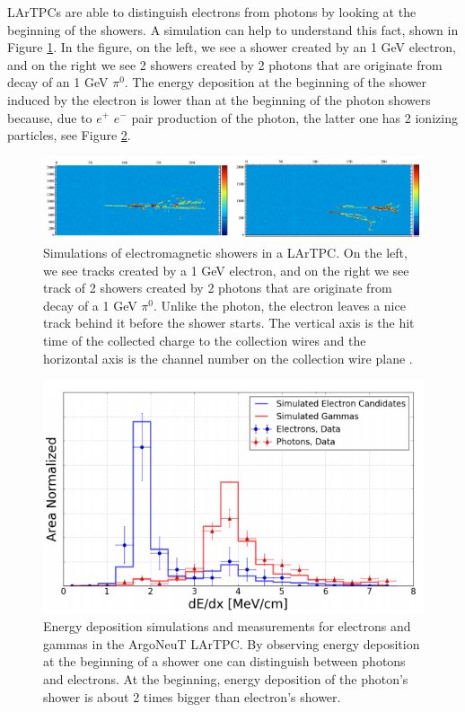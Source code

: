 \documentclass[a4paper]{article}\linespread{1.4}
\begin{document}
LArTPCs are able to distinguish electrons from photons by looking at the beginning of the showers. A simulation can help to understand this fact, shown in Figure \ref{fig:epi}. In the figure, on the left, we see a shower created by an 1 GeV electron, and on the right we see 2 showers created by 2 photons that are originate from decay of an 1 GeV $\pi^{0}$. 
The energy deposition at the beginning of the shower induced by the electron is lower than at the beginning of the photon showers because, due to $e^{+}$  $e^{-}$ pair production of the photon, the latter one has 2 ionizing particles, see Figure \ref{fig:mic}.
\begin{figure}[h!] \centering \includegraphics[width=124mm,scale=1.0]{epi.png} \caption{Simulations of electromagnetic showers in a LArTPC. On the left, we see tracks created by a 1 GeV electron, and on the right we see track of 2 showers created by 2 photons that are originate from decay of a 1 GeV $\pi^{0}$. Unlike the photon, the electron leaves a nice track behind it before the shower starts. The vertical axis is the hit time of the collected charge to the collection wires and the horizontal axis is the channel number on the collection wire plane \cite{LK}.} \label{fig:epi} \end{figure}  
\begin{figure}[h!] \centering \includegraphics[width=124mm,scale=1.0]{mic_neu.png} \caption{Energy deposition simulations and measurements for electrons and gammas in the ArgoNeuT LArTPC. By observing energy deposition at the beginning of a shower one can distinguish between photons and electrons. At the beginning, energy deposition of the photon's shower is about 2 times bigger than electron's shower. \cite{mic}} \label{fig:mic}\end{figure}  
\end{document}
